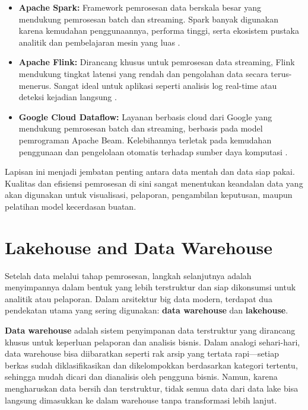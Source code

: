 \begin{itemize}
	\item \textbf{Apache Spark:} Framework pemrosesan data berskala besar yang mendukung pemrosesan batch dan streaming. Spark banyak digunakan karena kemudahan penggunaannya, performa tinggi, serta ekosistem pustaka analitik dan pembelajaran mesin yang luas \cite{zaharia2016apache}.
	
	\item \textbf{Apache Flink:} Dirancang khusus untuk pemrosesan data streaming, Flink mendukung tingkat latensi yang rendah dan pengolahan data secara terus-menerus. Sangat ideal untuk aplikasi seperti analisis log real-time atau deteksi kejadian langsung \cite{carbone2015apache}.
	
	\item \textbf{Google Cloud Dataflow:} Layanan berbasis cloud dari Google yang mendukung pemrosesan batch dan streaming, berbasis pada model pemrograman Apache Beam. Kelebihannya terletak pada kemudahan penggunaan dan pengelolaan otomatis terhadap sumber daya komputasi \cite{googledataflowdocs}.
\end{itemize}

Lapisan ini menjadi jembatan penting antara data mentah dan data siap pakai. Kualitas dan efisiensi pemrosesan di sini sangat menentukan keandalan data yang akan digunakan untuk visualisasi, pelaporan, pengambilan keputusan, maupun pelatihan model kecerdasan buatan.


\section{Lakehouse and Data Warehouse}

Setelah data melalui tahap pemrosesan, langkah selanjutnya adalah menyimpannya dalam bentuk yang lebih terstruktur dan siap dikonsumsi untuk analitik atau pelaporan. Dalam arsitektur big data modern, terdapat dua pendekatan utama yang sering digunakan: \textbf{data warehouse} dan \textbf{lakehouse}.

\textbf{Data warehouse} adalah sistem penyimpanan data terstruktur yang dirancang khusus untuk keperluan pelaporan dan analisis bisnis. Dalam analogi sehari-hari, data warehouse bisa diibaratkan seperti rak arsip yang tertata rapi—setiap berkas sudah diklasifikasikan dan dikelompokkan berdasarkan kategori tertentu, sehingga mudah dicari dan dianalisis oleh pengguna bisnis. Namun, karena mengharuskan data bersih dan terstruktur, tidak semua data dari data lake bisa langsung dimasukkan ke dalam warehouse tanpa transformasi lebih lanjut.

